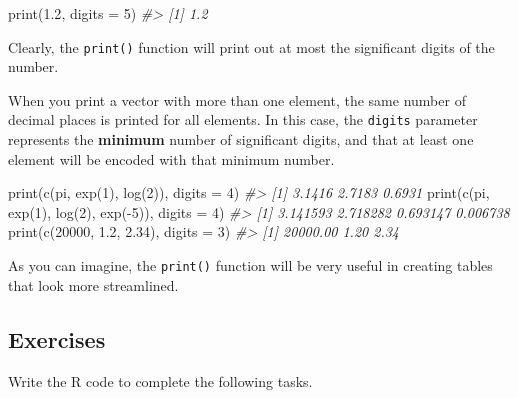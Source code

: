 \documentclass[
]{book}
\newenvironment{Shaded}{\begin{snugshade}}{\end{snugshade}}
\newcommand{\AttributeTok}[1]{\textcolor[rgb]{0.77,0.63,0.00}{#1}}
\newcommand{\CommentTok}[1]{\textcolor[rgb]{0.56,0.35,0.01}{\textit{#1}}}
\newcommand{\DecValTok}[1]{\textcolor[rgb]{0.00,0.00,0.81}{#1}}
\newcommand{\FloatTok}[1]{\textcolor[rgb]{0.00,0.00,0.81}{#1}}
\newcommand{\FunctionTok}[1]{\textcolor[rgb]{0.00,0.00,0.00}{#1}}
\newcommand{\NormalTok}[1]{#1}
\newcommand{\SpecialCharTok}[1]{\textcolor[rgb]{0.00,0.00,0.00}{#1}}
\begin{document}
\begin{Shaded}
\begin{Highlighting}[]
\FunctionTok{print}\NormalTok{(}\FloatTok{1.2}\NormalTok{, }\AttributeTok{digits =} \DecValTok{5}\NormalTok{)}
\CommentTok{\#\textgreater{} [1] 1.2}
\end{Highlighting}
\end{Shaded}

Clearly, the \texttt{print()} function will print out at most the significant digits of the number.

When you print a vector with more than one element, the same number of decimal places is printed for all elements. In this case, the \texttt{digits} parameter represents the \textbf{minimum} number of significant digits, and that at least one element will be encoded with that minimum number.

\begin{Shaded}
\begin{Highlighting}[]
\FunctionTok{print}\NormalTok{(}\FunctionTok{c}\NormalTok{(pi, }\FunctionTok{exp}\NormalTok{(}\DecValTok{1}\NormalTok{), }\FunctionTok{log}\NormalTok{(}\DecValTok{2}\NormalTok{)), }\AttributeTok{digits =} \DecValTok{4}\NormalTok{)}
\CommentTok{\#\textgreater{} [1] 3.1416 2.7183 0.6931}
\FunctionTok{print}\NormalTok{(}\FunctionTok{c}\NormalTok{(pi, }\FunctionTok{exp}\NormalTok{(}\DecValTok{1}\NormalTok{), }\FunctionTok{log}\NormalTok{(}\DecValTok{2}\NormalTok{), }\FunctionTok{exp}\NormalTok{(}\SpecialCharTok{{-}}\DecValTok{5}\NormalTok{)), }\AttributeTok{digits =} \DecValTok{4}\NormalTok{)}
\CommentTok{\#\textgreater{} [1] 3.141593 2.718282 0.693147 0.006738}
\FunctionTok{print}\NormalTok{(}\FunctionTok{c}\NormalTok{(}\DecValTok{20000}\NormalTok{, }\FloatTok{1.2}\NormalTok{, }\FloatTok{2.34}\NormalTok{), }\AttributeTok{digits =} \DecValTok{3}\NormalTok{)}
\CommentTok{\#\textgreater{} [1] 20000.00     1.20     2.34}
\end{Highlighting}
\end{Shaded}

As you can imagine, the \texttt{print()} function will be very useful in creating tables that look more streamlined.

\hypertarget{exercises-3}{%
\subsection{Exercises}\label{exercises-3}}

Write the R code to complete the following tasks.
\end{document}
